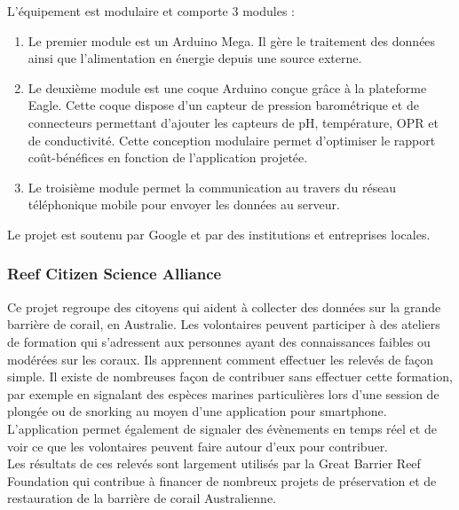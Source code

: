 \documentclass[10pt, conference, compsocconf]{llncs}
\begin{document}
			L'équipement est modulaire et comporte 3 modules :\\
			\begin{enumerate}
				\item Le premier module est un Arduino Mega. Il gère le traitement des données ainsi que l'alimentation en énergie depuis une source externe.
				\item Le deuxième module est une coque Arduino conçue grâce à la plateforme Eagle. Cette coque dispose d'un capteur de pression barométrique et de connecteurs permettant d'ajouter les capteurs de pH, température, OPR et de conductivité. Cette conception modulaire permet d'optimiser le rapport coût-bénéfices en fonction de l'application projetée.
				\item Le troisième module permet la communication au travers du réseau téléphonique mobile pour envoyer les données au serveur.
			\end{enumerate}
			Le projet est soutenu par Google et par des institutions et entreprises locales.

		\subsubsection{Reef Citizen Science Alliance}
			Ce projet regroupe des citoyens qui aident à collecter des données sur la grande barrière de corail, en Australie. Les volontaires peuvent participer à des ateliers de formation qui s'adressent aux personnes ayant des connaissances faibles ou modérées sur les coraux. Ils apprennent comment effectuer les relevés de façon simple. Il existe de nombreuses façon de contribuer sans effectuer cette formation, par exemple en signalant des espèces marines particulières lors d'une session de plongée ou de snorking au moyen d'une application pour smartphone. L'application permet également de signaler des évènements en temps réel et de voir ce que les volontaires peuvent faire autour d'eux pour contribuer. \\
			Les résultats de ces relevés sont largement utilisés par la Great Barrier Reef Foundation qui contribue à financer de nombreux projets de préservation et de  restauration de la barrière de corail Australienne.
		
\end{document}
